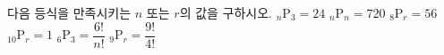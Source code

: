 다음 등식을 만족시키는 $n$ 또는 $r$의 값을 구하시오.
 ${}_n\mathrm{P}_3=24$
 ${}_n\mathrm{P}_n=720$
 ${}_8\mathrm{P}_r=56$
 ${}_{10}\mathrm{P}_r=1$
 ${}_6\mathrm{P}_3=\dfrac{6!}{n!}$
 ${}_9\mathrm{P}_r=\dfrac{9!}{4!}$
